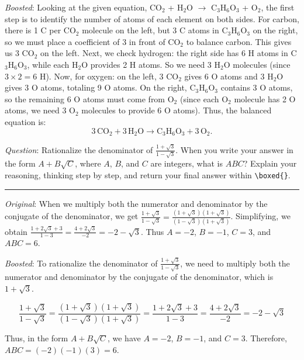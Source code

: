 \documentclass{article}
\begin{document}
\begin{center}
\begin{tcolorbox}
{\vspace{1.8em}

\textit{Boosted}: Looking at the given equation, CO$_2$ + H$_2$O $\rightarrow$ C$_3$H$_6$O$_3$ + O$_2$, the first step is to identify the number of atoms of each element on both sides. For carbon, there is 1 C per CO$_2$ molecule on the left, but 3 C atoms in C$_3$H$_6$O$_3$ on the right, so we must place a coefficient of 3 in front of CO$_2$ to balance carbon. This gives us 3 CO$_2$ on the left. Next, we check hydrogen: the right side has 6 H atoms in C$_3$H$_6$O$_3$, while each H$_2$O provides 2 H atoms. So we need 3 H$_2$O molecules (since $3 \times 2 = 6$ H). Now, for oxygen: on the left, 3 CO$_2$ gives 6 O atoms and 3 H$_2$O gives 3 O atoms, totaling 9 O atoms. On the right, C$_3$H$_6$O$_3$ contains 3 O atoms, so the remaining 6 O atoms must come from O$_2$ (since each O$_2$ molecule has 2 O atoms, we need 3 O$_2$ molecules to provide 6 O atoms). Thus, the balanced equation is:
\[
3\,\mathrm{CO}_2 + 3\,\mathrm{H}_2\mathrm{O}
\rightarrow
\mathrm{C}_3\mathrm{H}_6\mathrm{O}_3 + 3\,\mathrm{O}_2.
\]
}
\end{tcolorbox}
\end{center}

\begin{center}
\begin{tcolorbox}[
    enhanced,
    width=\linewidth,
    fit to height=8cm,
    colback=green!4,
    colframe=green!50!black,
    boxrule=0.5pt,
    arc=2pt,
    title=\small{Math (Qwen2.5-3B)},
    left=2pt,
    right=2pt,
    top=1pt,
    bottom=0pt
]
{\small
\textit{Question}: Rationalize the denominator of
$\frac{1+\sqrt{3}}{1-\sqrt{3}}$.
When you write your answer in the form $A+B\sqrt{C}$, where $A$, $B$, and $C$ are integers, what is $ABC$?
Explain your reasoning, thinking step by step, and return your final answer within \texttt{\textbackslash boxed\{\}}.

\vspace{0.8em}
\noindent\rule{\linewidth}{0.4pt}
\vspace{0.2em}

\textit{Original}: When we multiply both the numerator and denominator by the conjugate of the denominator, we get
$\frac{1+\sqrt{3}}{1-\sqrt{3}}
=
\frac{(1+\sqrt{3})(1+\sqrt{3})}{(1-\sqrt{3})(1+\sqrt{3})}$.
Simplifying, we obtain
$\frac{1+2\sqrt{3}+3}{1-3}
=
\frac{4+2\sqrt{3}}{-2}
=
-2-\sqrt{3}$.
Thus $A=-2$, $B=-1$, $C=3$, and $ABC=\boxed{6}$.

\vspace{1.8em}

\textit{Boosted}: To rationalize the denominator of
$\frac{1+\sqrt{3}}{1-\sqrt{3}}$,
we need to multiply both the numerator and denominator by the conjugate of the denominator, which is $1+\sqrt{3}$.

\[
\frac{1+\sqrt{3}}{1-\sqrt{3}}
=
\frac{(1+\sqrt{3})(1+\sqrt{3})}
     {(1-\sqrt{3})(1+\sqrt{3})}
=
\frac{1+2\sqrt{3}+3}{1-3}
=
\frac{4+2\sqrt{3}}{-2}
=
-2-\sqrt{3}
\]

Thus, in the form $A+B\sqrt{C}$, we have $A=-2$, $B=-1$, and $C=3$.
Therefore,
$ABC=(-2)(-1)(3)=\boxed{6}$.
}
\end{tcolorbox}
\end{center}
\end{document}
